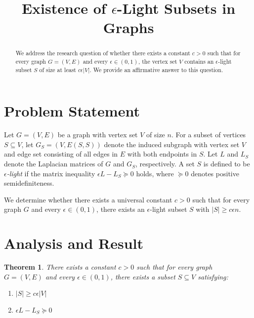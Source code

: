 \documentclass{article}
\newtheorem{theorem}{Theorem}
\begin{document}
\title{Existence of $\epsilon$-Light Subsets in Graphs}
\author{}
\date{}
\maketitle

\begin{abstract}
We address the research question of whether there exists a constant $c > 0$ such that for every graph $G=(V, E)$ and every $\epsilon \in (0, 1)$, the vertex set $V$ contains an $\epsilon$-light subset $S$ of size at least $c \epsilon |V|$. We provide an affirmative answer to this question.
\end{abstract}

\section{Problem Statement}

Let $G = (V, E)$ be a graph with vertex set $V$ of size $n$. For a subset of vertices $S \subseteq V$, let $G_S = (V, E(S,S))$ denote the induced subgraph with vertex set $V$ and edge set consisting of all edges in $E$ with both endpoints in $S$. Let $L$ and $L_S$ denote the Laplacian matrices of $G$ and $G_S$, respectively. A set $S$ is defined to be \textit{$\epsilon$-light} if the matrix inequality $\epsilon L - L_S \succeq 0$ holds, where $\succeq 0$ denotes positive semidefiniteness.

We determine whether there exists a universal constant $c > 0$ such that for every graph $G$ and every $\epsilon \in (0, 1)$, there exists an $\epsilon$-light subset $S$ with $|S| \geq c \epsilon n$.

\section{Analysis and Result}

\begin{theorem}
There exists a constant $c > 0$ such that for every graph $G = (V, E)$ and every $\epsilon \in (0, 1)$, there exists a subset $S \subseteq V$ satisfying:
\begin{enumerate}
    \item $|S| \geq c \epsilon |V|$
    \item $\epsilon L - L_S \succeq 0$
\end{enumerate}
\end{theorem}
\end{document}
